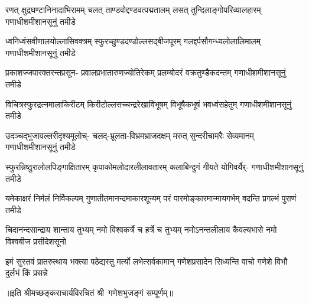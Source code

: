 

\fourlineindentedshloka
{रणत् क्षुद्रघण्टानिनादाभिरामम्}
{चलत् ताण्डवोद्दण्डवत्पद्मतालम्}
{लसत् तुन्दिलाङ्गोपरिव्यालहारम्}
{गणाधीशमीशानसूनुं तमीडे}%

\fourlineindentedshloka
{ध्वनिध्वंसवीणालयोल्लासिवक्त्रम्}
{स्फुरच्छुण्डदण्डोल्लसद्‌बीजपूरम्}
{गलद्दर्पसौगन्ध्यलोलालिमालम्}
{गणाधीशमीशानसूनुं तमीडे}%

\fourlineindentedshloka
{प्रकाशज्जपारक्तरन्तप्रसून-}
{प्रवालप्रभातारुणज्योतिरेकम्}
{प्रलम्बोदरं वक्रतुण्डैकदन्तम्}
{गणाधीशमीशानसूनुं तमीडे}%

\fourlineindentedshloka
{विचित्रस्फुरद्रत्नमालाकिरीटम्}
{किरीटोल्लसच्चन्द्ररेखाविभूषम्}
{विभूषैकभूषं भवध्वंसहेतुम्}
{गणाधीशमीशानसूनुं तमीडे}%

\fourlineindentedshloka
{उदञ्चद्भुजावल्लरीदृश्यमूलोच्-}
{चलद्‌-भ्रूलता-विभ्रमभ्राजदक्षम्}
{मरुत् सुन्दरीचामरैः सेव्यमानम्}
{गणाधीशमीशानसूनुं तमीडे}%

\fourlineindentedshloka
{स्फुरन्निष्ठुरालोलपिङ्गाक्षितारम्}
{कृपाकोमलोदारलीलावतारम्}
{कलाबिन्दुगं गीयते योगिवर्यैर्-}
{गणाधीशमीशानसूनुं तमीडे}%

\fourlineindentedshloka
{यमेकाक्षरं निर्मलं निर्विकल्पम्}
{गुणातीतमानन्दमाकारशून्यम्}
{परं पारमोङ्कारमान्मायगर्भम्}
{वदन्ति प्रगल्भं पुराणं तमीडे}%

\fourlineindentedshloka
{चिदानन्दसान्द्राय शान्ताय तुभ्यम्}
{नमो विश्वकर्त्रे च हर्त्रे च तुभ्यम्}
{नमोऽनन्तलीलाय कैवल्यभासे}
{नमो विश्वबीज प्रसीदेशसूनो}%

\fourlineindentedshloka
{इमं सुस्तवं प्रातरुत्थाय भक्त्या}
{पठेद्यस्तु मर्त्यो लभेत्सर्वकामान्}
{गणेशप्रसादेन सिध्यन्ति वाचो}
{गणेशे विभौ दुर्लभं किं प्रसन्ने}%

॥इति श्रीमच्छङ्कराचार्यविरचितं श्री~गणेशभुजङ्गं सम्पूर्णम्॥